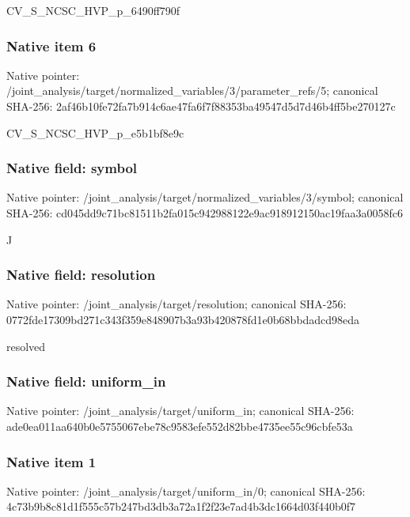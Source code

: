 \documentclass[10pt,a4paper]{article}
\begin{document}
\begingroup\raggedright\sloppy CV\_\allowbreak{}S\_\allowbreak{}NCSC\_\allowbreak{}HVP\_\allowbreak{}p\_\allowbreak{}6490ff790f\par\endgroup

\subsubsection{Native item 6}
Native pointer: /joint\_\allowbreak{}analysis/target/normalized\_\allowbreak{}variables/3/parameter\_\allowbreak{}refs/5; canonical SHA-256: 2af46b10fe72fa7b914c6ae47fa6f7f88353ba49547d5d7d46b4ff5be270127c

\begingroup\raggedright\sloppy CV\_\allowbreak{}S\_\allowbreak{}NCSC\_\allowbreak{}HVP\_\allowbreak{}p\_\allowbreak{}e5b1bf8e9c\par\endgroup

\subsubsection{Native field: symbol}
Native pointer: /joint\_\allowbreak{}analysis/target/normalized\_\allowbreak{}variables/3/symbol; canonical SHA-256: cd045dd9c71bc81511b2fa015c942988122e9ac918912150ac19faa3a0058fc6

\begingroup\raggedright\sloppy J\par\endgroup

\subsubsection{Native field: resolution}
Native pointer: /joint\_\allowbreak{}analysis/target/resolution; canonical SHA-256: 0772fde17309bd271c343f359e848907b3a93b420878fd1e0b68bbdadcd98eda

\begingroup\raggedright\sloppy resolved\par\endgroup

\subsubsection{Native field: uniform\_\allowbreak{}in}
Native pointer: /joint\_\allowbreak{}analysis/target/uniform\_\allowbreak{}in; canonical SHA-256: ade0ea011aa640b0e5755067ebe78c9583efe552d82bbe4735ee55c96cbfe53a

\subsubsection{Native item 1}
Native pointer: /joint\_\allowbreak{}analysis/target/uniform\_\allowbreak{}in/0; canonical SHA-256: 4c73b9b8c81d1f555c57b247bd3db3a72a1f2f23e7ad4b3dc1664d03f440b0f7
\end{document}
